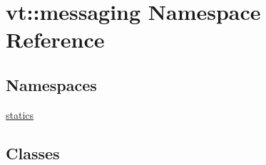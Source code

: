 \hypertarget{namespacevt_1_1messaging}{}\section{vt\+:\+:messaging Namespace Reference}
\label{namespacevt_1_1messaging}
\subsection*{Namespaces}
\begin{DoxyCompactItemize}
\item 
 \hyperlink{namespacevt_1_1messaging_1_1statics}{statics}
\end{DoxyCompactItemize}
\subsection*{Classes}
